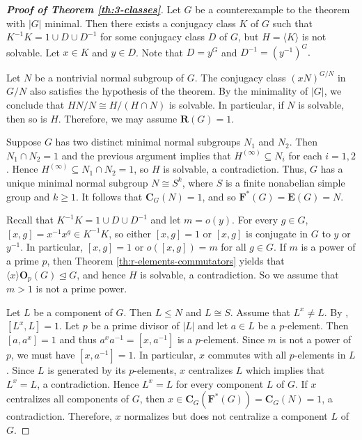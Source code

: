 \documentclass[twoside,a4paper,reqno,12pt]{amsart}
\newcommand{\<}{\langle}
\renewcommand{\>}{\rangle}
\newcommand{\la}{\langle}
\newcommand{\ra}{\rangle}
\newcommand{\leqs}{\leqslant}
\newcommand{\OB}{\mathbf{O}}
\newcommand{\CB}{\mathbf{C}}
\newcommand{\FB}{\mathbf{F}}
\newcommand{\RB}{\mathbf{R}}
\newcommand{\EB}{\mathbf{E}}
\renewcommand{\leq}{\leqs}
\renewcommand{\:}{\colon}
\theoremstyle{definition}
\begin{document}
\begin{proof}[\textbf{Proof of Theorem \ref{th:3-classes}}]
Let $G$ be a counterexample to the theorem with $|G|$ minimal.  Then there exists a conjugacy class $K$ of $G$ such that $K^{-1}K=1\cup D\cup D^{-1}$ for some conjugacy class $D$ of $G$, but $H=\la K\ra$ is not solvable. Let $x\in K$ and $y\in D$. Note that  $D=y^G$ and $D^{-1}=(y^{-1})^G.$

Let $N$ be a nontrivial normal subgroup of $G$. The conjugacy class $(xN)^{G/N}$ in $G/N$ also satisfies the hypothesis of the theorem. By the minimality of $|G|$, we conclude that $HN/N\cong H/(H\cap N)$ is solvable. In particular, if $N$ is solvable, then so is $H.$ Therefore, we may assume $\RB(G)=1$.

Suppose $G$ has two distinct minimal normal subgroups $N_1$ and $N_2$. Then $N_1\cap N_2=1$ and the previous argument implies that  $H^{(\infty)}\subseteq N_i$ for each $i=1,2$. Hence $H^{(\infty)}\subseteq N_1\cap N_2=1$, so $H$ is solvable, a contradiction. Thus, $G$ has a unique minimal normal subgroup $N\cong S^k$, where $S$ is a finite nonabelian simple group and $k\ge 1$. It follows that $\CB_G(N)=1$, and so $\FB^*(G)=\EB(G)=N$. 

Recall that $K^{-1}K=1\cup D\cup D^{-1}$ and let $m=o(y)$. For every $g\in G$, $[x,g]=x^{-1}x^g\in K^{-1}K$, so either  $[x,g]=1$ or $[x,g]$ is conjugate in $G$ to $y$ or $y^{-1}$. In particular,  $[x,g]=1$ or $o([x,g])=m$ for all $g\in G.$  If $m$ is a power of a prime $p$, then Theorem \ref{th:r-elements-commutators} yields that $\la x\ra \OB_p(G)\unlhd G$, and hence $H$ is solvable, a contradiction. So we assume  that $m>1$ is not a prime power.

Let $L$ be a component of $G$. Then $L\leq N$ and $L\cong S.$  Assume that $L^x\neq L$. By \cite[31.4]{Aschbacher}, $[L^x,L]=1$.  Let  $p$ be a prime divisor of $|L|$ and let $a\in L$ be  a $p$-element. Then $[a,a^x]=1$ and thus $a^xa^{-1}=[x,a^{-1}]$ is a $p$-element. Since $m$ is not a power of $p$, we must have $[x,a^{-1}]=1$. In particular, $x$ commutes with all $p$-elements in $L$. Since $L$ is generated by its $p$-elements, $x$ centralizes $L$ which implies that $L^x=L$, a contradiction. Hence $L^x=L$ for every component $L$ of $G$. If $x$ centralizes all components of $G$, then $x\in \CB_G(\FB^*(G))=\CB_G(N)=1$, a contradiction. Therefore, $x$ normalizes but does not centralize a component $L$ of $G$.



\end{proof}
\end{document}

